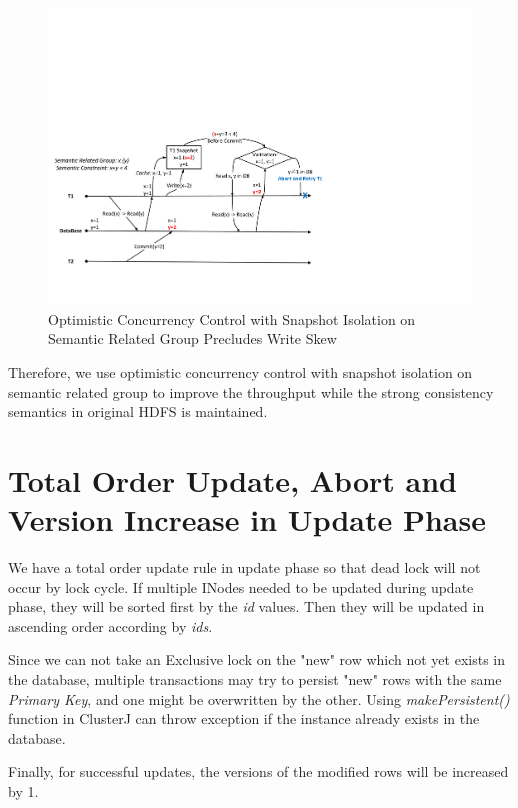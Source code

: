 \begin{figure}[h]
	\centering
	\includegraphics[width=\linewidth]{figs/snapwriteskew.pdf}
	\caption{Optimistic Concurrency Control with Snapshot Isolation on Semantic Related Group Precludes Write Skew}
	\label{fig:snapwriteskew}
\end{figure}

\noindent Therefore, we use optimistic concurrency control with snapshot isolation on semantic related group to improve the throughput while the strong consistency semantics in original HDFS is maintained.

\section{Total Order Update, Abort and Version Increase in Update Phase}
We have a total order update rule in update phase so that dead lock will not occur by lock cycle. If multiple INodes needed to be updated during update phase, they will be sorted first by the \textit{id} values. Then they will be updated in ascending order according by \textit{ids}. 

\noindent Since we can not take an Exclusive lock on the "new" row which not yet exists in the database, multiple transactions may try to persist "new" rows with the same \textit{Primary Key}, and one might be overwritten by the other. Using \textit{makePersistent()} function in ClusterJ can throw exception if the instance already exists in the database.

\noindent Finally, for successful updates, the versions of the modified rows will be increased by 1.

